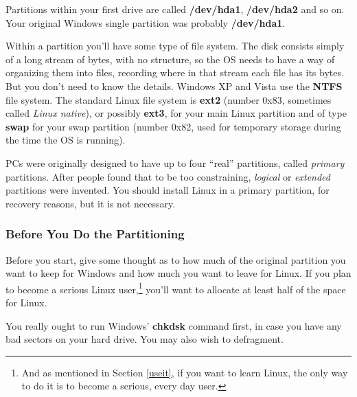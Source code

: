 \documentclass[11pt]{article}
\begin{document}
Partitions within your first drive are called {\bf /dev/hda1}, {\bf
/dev/hda2} and so on.  Your original Windows single partition was
probably {\bf /dev/hda1}.  

Within a partition you'll have some type of file system.  The disk
consists simply of a long stream of bytes, with no structure, so the OS
needs to have a way of organizing them into files, recording where in
that stream each file has its bytes.  But you don't need to know the
details.  Windows XP and Vista use the {\bf NTFS} file system.  The
standard Linux file system is {\bf ext2} (number 0x83, sometimes called
{\it Linux native}), or possibly {\bf ext3}, for your main Linux
partition and of type {\bf swap} for your swap partition (number 0x82,
used for temporary storage during the time the OS is running).

PCs were originally designed to have up to four ``real'' partitions,
called {\it primary} partitions.  After people found that to be too
constraining, {\it logical} or {\it extended} partitions were invented.
You should install Linux in a primary partition, for recovery reasons,
but it is not necessary.

\subsubsection{Before You Do the Partitioning}

Before you start, give some thought as to how much of the original
partition you want to keep for Windows and how much you want to leave
for Linux.  If you plan to become a serious Linux user,\footnote{And as
mentioned in Section \ref{useit}, if you want to learn Linux, the only
way to do it is to become a serious, every day user.} you'll want to
allocate at least half of the space for Linux. 

You really ought to run Windows' {\bf chkdsk} command first, in case you
have any bad sectors on your hard drive.  You may also wish to
defragment.

% 
% 
% 
\end{document}
